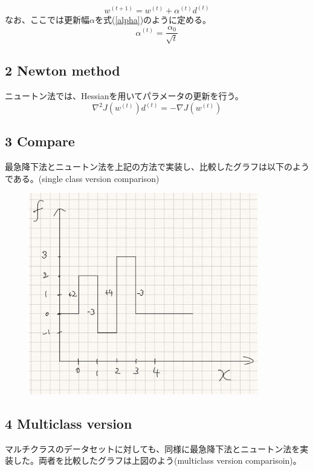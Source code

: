 \documentclass[a4j,11pt]{jarticle}
\begin{document}
\begin{equation}
    w^{(t+1)} = w^{(t)} + \alpha^{(t)} d^{(t)}
\end{equation}
なお、ここでは更新幅$\alpha$を式(\ref{alpha})のように定める。
\begin{equation}
    \alpha^{(t)} = \frac{\alpha_{0}}{\sqrt{t}}\label{alpha}
\end{equation}

\subsection*{2 Newton method}
ニュートン法では、Hessianを用いてパラメータの更新を行う。
\begin{equation}
    \nabla^2J(w^{(t)})d^{(t)} = -\nabla J(w^{(t)})
\end{equation}

\url{}
\subsection*{3 Compare}
最急降下法とニュートン法を上記の方法で実装し、比較したグラフは以下のようである。(single class version comparison) 

\begin{figure}
    \centering
    \includegraphics[width=10cm]{p1-1.png}
\end{figure}

\newpage
\subsection*{4 Multiclass version}
マルチクラスのデータセットに対しても、同様に最急降下法とニュートン法を実装した。両者を比較したグラフは上図のよう(multiclass version comparisoin)。
\end{document}
